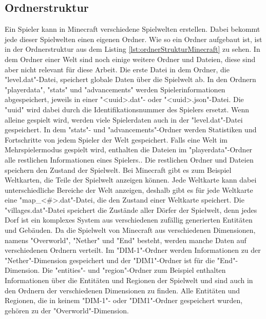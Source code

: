 \subsection{Ordnerstruktur} \label{ssec:ordnerstruktur}
Ein Spieler kann in Minecraft verschiedene Spielwelten erstellen. Dabei bekommt jede dieser Spielwelten einen eigenen Ordner. Wie so ein Ordner aufgebaut ist, ist in der Ordnerstruktur aus dem Listing \ref{lst:ordnerStrukturMinecraft} zu sehen. In dem Ordner einer Welt sind noch einige weitere Ordner und Dateien, diese sind aber nicht relevant für diese Arbeit. Die erste Datei in dem Ordner, die "level.dat"-Datei, speichert globale Daten über die Spielwelt ab. In den Ordnern "playerdata", "stats" und "advancements" werden Spielerinformationen abgespeichert, jeweils in einer "<uuid>.dat"- oder "<uuid>.json"-Datei. Die "uuid" wird dabei durch die Identifikationsnummer des Spielers ersetzt. Wenn alleine gespielt wird, werden viele Spielerdaten auch in der "level.dat"-Datei gespeichert. In dem "stats"- und "advancements"-Ordner werden Statistiken und Fortschritte von jedem Spieler der Welt gespeichert. Falls eine Welt im Mehrspielermodus gespielt wird, enthalten die Dateien im "playerdata"-Ordner alle restlichen Informationen eines Spielers.\cite{minecraftPlayerdatFormat}. Die restlichen Ordner und Dateien speichern den Zustand der Spielwelt. Bei Minecraft gibt es zum Beispiel Weltkarten, die Teile der Spielwelt anzeigen können. Jede Weltkarte kann dabei unterschiedliche Bereiche der Welt anzeigen, deshalb gibt es für jede Weltkarte eine "map\_<\#>.dat"-Datei, die den Zustand einer Weltkarte speichert. Die "villages.dat"-Datei speichert die Zustände aller Dörfer der Spielwelt, denn jedes Dorf ist ein komplexes System aus verschiedenen zufällig generierten Entitäten und Gebäuden. Da die Spielwelt von Minecraft aus verschiedenen Dimensionen, namens "Overworld", "Nether" und "End" besteht, werden manche Daten auf verschiedenen Ordnern verteilt. Im "DIM-1"-Ordner werden Informationen zu der "Nether"-Dimension gespeichert und der "DIM1"-Ordner ist für die "End"-Dimension. Die "entities"- und "region"-Ordner zum Beispiel enthalten Informationen über die Entitäten und Regionen der Spielwelt und sind auch in den Ordnern der verschiedenen Dimensionen zu finden. Alle Entitäten und Regionen, die in keinem "DIM-1"- oder "DIM1"-Ordner gespeichert wurden, gehören zu der "Overworld"-Dimension.\cite{minecraftFolderStruc}

